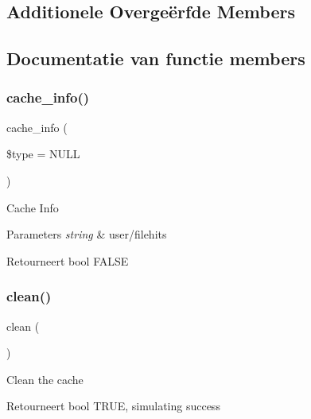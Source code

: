\subsection*{Additionele Overge\"{e}rfde Members}


\subsection{Documentatie van functie members}
\mbox{\label{class_c_i___cache__dummy_aa8b9c4d9f0387156736ccd8850f0727e}} 
\subsubsection{\texorpdfstring{cache\_info()}{cache\_info()}}
{\footnotesize\ttfamily cache\+\_\+info (\begin{DoxyParamCaption}\item[{}]{\$type = {\ttfamily NULL} }\end{DoxyParamCaption})}

Cache Info


\begin{DoxyParams}{Parameters}
{\em string} & user/filehits \\
\hline
\end{DoxyParams}
\begin{DoxyReturn}{Retourneert}
bool F\+A\+L\+SE 
\end{DoxyReturn}
\mbox{\label{class_c_i___cache__dummy_adb40b812890a8bc058bf6b7a0e1a54d9}} 
\subsubsection{\texorpdfstring{clean()}{clean()}}
{\footnotesize\ttfamily clean (\begin{DoxyParamCaption}{ }\end{DoxyParamCaption})}

Clean the cache

\begin{DoxyReturn}{Retourneert}
bool T\+R\+UE, simulating success 
\end{DoxyReturn}
\mbox{\label{class_c_i___cache__dummy_a4eb1c2772c8efc48c411ea060dd040b7}} 
